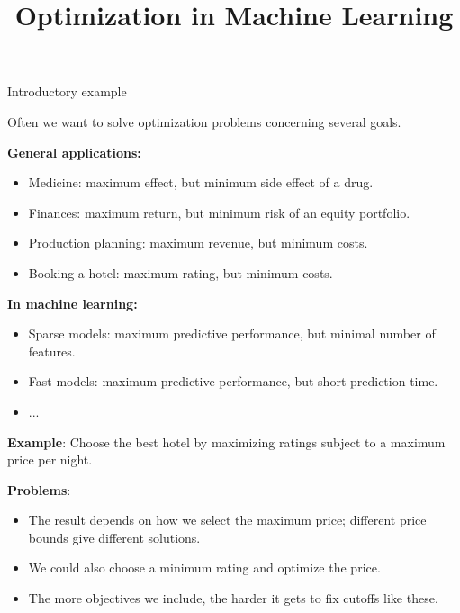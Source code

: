 \documentclass[11pt,compress,t,notes=noshow,xcolor=table]{beamer}
\title{Optimization in Machine Learning}
\begin{document}

\begin{vbframe}{Introductory example}

Often we want to solve optimization problems concerning several goals.

\bigskip
\textbf{General applications:}
\begin{itemize}
\item Medicine: maximum effect, but minimum side effect of a drug.
\item Finances: maximum return, but minimum risk of an equity portfolio.
\item Production planning: maximum revenue, but minimum costs.
\item Booking a hotel: maximum rating, but minimum costs.
\end{itemize}

\bigskip
\textbf{In machine learning:}
\begin{itemize}
\item Sparse models: maximum predictive performance, but minimal number of features.
\item Fast models: maximum predictive performance, but short prediction time.
\item ...
\end{itemize}

\framebreak

\textbf{Example}: Choose the best hotel by maximizing ratings subject to a maximum price per night.

\bigskip
\textbf{Problems}:
\begin{itemize}
 \item The result depends on how we select the maximum price; different price bounds give different solutions.
 \item We could also choose a minimum rating and optimize the price.
 \item The more objectives we include, the harder it gets to fix cutoffs like these.
\end{itemize}


\end{vbframe}
\end{document}

